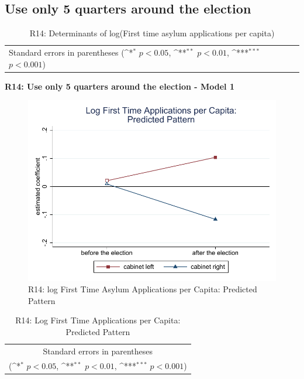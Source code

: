 \documentclass[10pt,a4paper]{scrartcl}
\begin{document}


\clearpage
\FloatBarrier
\subsection{Use only 5 quarters around the election}
\begin{table}[!ht]\centering
	\renewcommand{\arraystretch}{1.25}
	\small
	\def\sym#1{\ifmmode^{#1}\else\(^{#1}\)\fi}
	\caption{R14: Determinants of log(First time asylum applications per capita)}
	\begin{tabular}{l*{3}{c}}
		\hline\hline
		
		\hline\hline
		\multicolumn{4}{l}{\footnotesize Standard errors in parentheses (\sym{*} \(p<0.05\), \sym{**} \(p<0.01\), \sym{***} \(p<0.001\))}\\
	\end{tabular}
\end{table}

\clearpage
\textbf{R14: Use only 5 quarters around the election - Model 1}
\begin{figure}[!ht]
	\centering
	\includegraphics[width=1\textwidth]{figures_edited/app_graph1_R14.pdf}
	\caption{R14: log First Time Asylum Applications per Capita: Predicted Pattern}
\end{figure}

\begin{table}[!ht]\centering
	\renewcommand{\arraystretch}{1.25}
	\def\sym#1{\ifmmode^{#1}\else\(^{#1}\)\fi}
	\caption{R14: Log First Time Applications per Capita: Predicted Pattern}
	\begin{tabular}{l*{2}{c}}
		\hline\hline
		
		\hline\hline
		\multicolumn{3}{c}{\footnotesize Standard errors in parentheses} \\
		\multicolumn{3}{c}{\footnotesize (\sym{*} \(p<0.05\), \sym{**} \(p<0.01\), \sym{***} \(p<0.001\))}\\
	\end{tabular}
\end{table}
\end{document}
